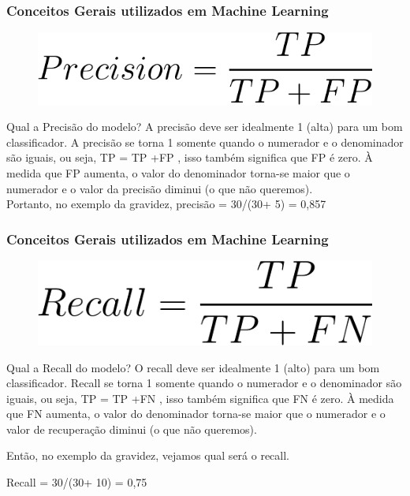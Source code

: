 \documentclass{beamer}
\begin{document}
\begin{frame}
	\frametitle{Conceitos Gerais utilizados em Machine Learning}
	\begin{figure}
		\centering
		\includegraphics[width=0.4\linewidth]{figures/precision}
	\end{figure}
	\begin{block}{Qual a Precisão do modelo?}
		A precisão deve ser idealmente 1 (alta) para um bom classificador. A precisão se torna 1 somente quando o numerador e o denominador são iguais, ou seja, TP = TP +FP , isso também significa que FP é zero. À medida que FP aumenta, o valor do denominador torna-se maior que o numerador e o valor da precisão diminui (o que não queremos). \\
		Portanto, no exemplo da gravidez, precisão = 30/(30+ 5) = 0,857
	\end{block}
\end{frame}
\begin{frame}
	\frametitle{Conceitos Gerais utilizados em Machine Learning}
	\begin{figure}
		\centering
		\includegraphics[width=0.4\linewidth]{figures/recall}
	\end{figure}
	\begin{block}{Qual a Recall do modelo?}
		O recall deve ser idealmente 1 (alto) para um bom classificador. Recall se torna 1 somente quando o numerador e o denominador são iguais, ou seja, TP = TP +FN , isso também significa que FN é zero. À medida que FN aumenta, o valor do denominador torna-se maior que o numerador e o valor de recuperação diminui (o que não queremos).
		
		Então, no exemplo da gravidez, vejamos qual será o recall.
		
		Recall = 30/(30+ 10) = 0,75
	\end{block}
\end{frame}
\end{document}
